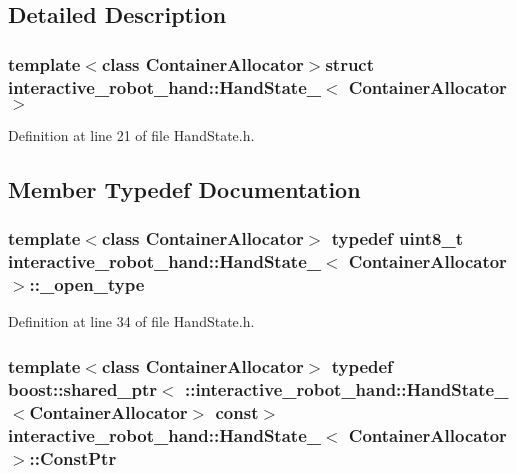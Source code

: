 \subsection{Detailed Description}
\subsubsection*{template$<$class Container\-Allocator$>$struct interactive\-\_\-robot\-\_\-hand\-::\-Hand\-State\-\_\-$<$ Container\-Allocator $>$}



Definition at line 21 of file Hand\-State.\-h.



\subsection{Member Typedef Documentation}
\subsubsection[{\-\_\-open\-\_\-type}]{\setlength{\rightskip}{0pt plus 5cm}template$<$class Container\-Allocator$>$ typedef uint8\-\_\-t {\bf interactive\-\_\-robot\-\_\-hand\-::\-Hand\-State\-\_\-}$<$ Container\-Allocator $>$\-::{\bf \-\_\-open\-\_\-type}}\label{structinteractive__robot__hand_1_1HandState___a373ad00b2176c5945d4ca9fb483afa83}


Definition at line 34 of file Hand\-State.\-h.

\subsubsection[{Const\-Ptr}]{\setlength{\rightskip}{0pt plus 5cm}template$<$class Container\-Allocator$>$ typedef boost\-::shared\-\_\-ptr$<$ \-::{\bf interactive\-\_\-robot\-\_\-hand\-::\-Hand\-State\-\_\-}$<$Container\-Allocator$>$ const$>$ {\bf interactive\-\_\-robot\-\_\-hand\-::\-Hand\-State\-\_\-}$<$ Container\-Allocator $>$\-::{\bf Const\-Ptr}}\label{structinteractive__robot__hand_1_1HandState___ab7ec9e1d65e0c7a86214429237e94a7b}


